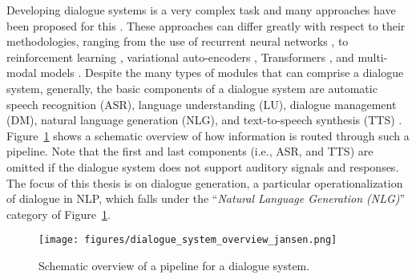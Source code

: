 Developing dialogue systems is a very complex task and many approaches have been proposed for this \citep{mctear2020conversational}.
These approaches can differ greatly with respect to their methodologies, ranging from the use of recurrent neural networks \citep{li-etal-2016-deep}, to reinforcement learning \citep{mo2018personalizing}, variational auto-encoders \citep{ruan2019condition}, Transformers \citep{madotto-etal-2020-plug}, and multi-modal models \citep{shuster-etal-2021-multi}.
Despite the many types of modules that can comprise a dialogue system, generally, the basic components of a dialogue system are automatic speech recognition (ASR), language understanding (LU), dialogue management (DM), natural language generation (NLG), and text-to-speech synthesis (TTS) \citep{chen-etal-2017-deep}. Figure~\ref{fig:dialogue_system_overview} shows a schematic overview of how information is routed through such a pipeline. Note that the first and last components (i.e., ASR, and TTS) are omitted if the dialogue system does not support auditory signals and responses. The focus of this thesis is on dialogue generation, a particular operationalization of dialogue in NLP, which falls under the ``\textit{Natural Language Generation (NLG)}'' category of Figure~\ref{fig:dialogue_system_overview}.

\begin{figure}[H]
    \centering
    \texttt{[image: figures/dialogue\_system\_overview\_jansen.png]}
    \caption{Schematic overview of a pipeline for a dialogue system.}
    \label{fig:dialogue_system_overview}
\end{figure}





